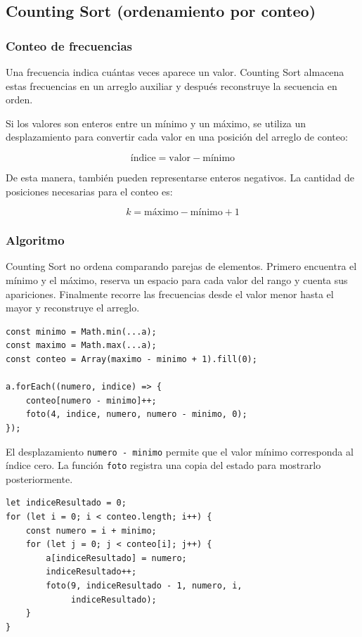 \documentclass[11pt,letterpaper]{article}
\begin{document}
\subsection{Counting Sort (ordenamiento por conteo)}

\subsubsection{Conteo de frecuencias}

Una frecuencia indica cuántas veces aparece un valor. Counting Sort almacena estas frecuencias en un arreglo auxiliar y después reconstruye la secuencia en orden.

Si los valores son enteros entre un mínimo y un máximo, se utiliza un desplazamiento para convertir cada valor en una posición del arreglo de conteo:

\[
\text{índice}=\text{valor}-\text{mínimo}
\]

De esta manera, también pueden representarse enteros negativos. La cantidad de posiciones necesarias para el conteo es:

\[
k=\text{máximo}-\text{mínimo}+1
\]

\subsubsection{Algoritmo}

Counting Sort no ordena comparando parejas de elementos. Primero encuentra el mínimo y el máximo, reserva un espacio para cada valor del rango y cuenta sus apariciones. Finalmente recorre las frecuencias desde el valor menor hasta el mayor y reconstruye el arreglo.

\begin{lstlisting}[caption={Conteo de apariciones en Counting Sort}]
const minimo = Math.min(...a);
const maximo = Math.max(...a);
const conteo = Array(maximo - minimo + 1).fill(0);

a.forEach((numero, indice) => {
    conteo[numero - minimo]++;
    foto(4, indice, numero, numero - minimo, 0);
});
\end{lstlisting}

El desplazamiento \texttt{numero - minimo} permite que el valor mínimo corresponda al índice cero. La función \texttt{foto} registra una copia del estado para mostrarlo posteriormente.

\begin{lstlisting}[caption={Reconstrucción del arreglo ordenado}]
let indiceResultado = 0;
for (let i = 0; i < conteo.length; i++) {
    const numero = i + minimo;
    for (let j = 0; j < conteo[i]; j++) {
        a[indiceResultado] = numero;
        indiceResultado++;
        foto(9, indiceResultado - 1, numero, i,
             indiceResultado);
    }
}
\end{lstlisting}
\end{document}
